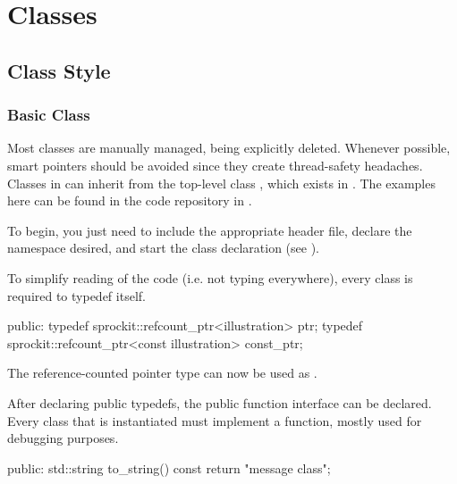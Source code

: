 
\chapter{\sstmacro Classes}\label{chapter:classes}

\section{Class Style}\label{sec:style}

\subsection{Basic Class}\label{subsec:basicClass}
Most classes are manually managed, being explicitly deleted.  Whenever possible,
smart pointers should be avoided since they create thread-safety headaches.
Classes in \sstmacro can inherit from the top-level class , 
which exists in . 
The examples here can be found in the code repository in .

To begin, you just need to include the appropriate header file, declare the namespace desired, and start the class declaration (see ).

\begin{CppCode}
#include <sprockit/ptr_type.h>

namespace sstmac {
namespace tutorial {

class illustration :
  public sprockit::ptr_type
{
\end{CppCode}
To simplify reading of the code (i.e. not typing  everywhere), every class is required to typedef itself.

\begin{CppCode}
 public:
  typedef sprockit::refcount_ptr<illustration> ptr;
  typedef sprockit::refcount_ptr<const illustration> const_ptr;
\end{CppCode}
The reference-counted pointer type can now be used as .

After declaring public typedefs, the public function interface can be declared.
Every  class that is instantiated must implement a  function,
mostly used for debugging purposes.

\begin{CppCode}
 public:
  std::string
  to_string() const {
    return "message class";
   }
\end{CppCode}

